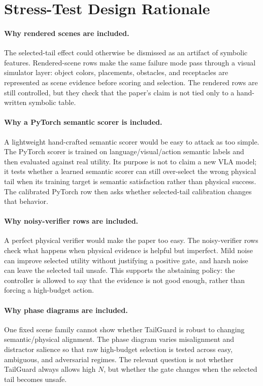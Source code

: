 \documentclass{article}
\begin{document}
\section{Stress-Test Design Rationale}
\label{app:stress-rationale}

\paragraph{Why rendered scenes are included.}
The selected-tail effect could otherwise be dismissed as an artifact of symbolic features. Rendered-scene rows make the same failure mode pass through a visual simulator layer: object colors, placements, obstacles, and receptacles are represented as scene evidence before scoring and selection. The rendered rows are still controlled, but they check that the paper's claim is not tied only to a hand-written symbolic table.

\paragraph{Why a PyTorch semantic scorer is included.}
A lightweight hand-crafted semantic scorer would be easy to attack as too simple. The PyTorch scorer is trained on language/visual/action semantic labels and then evaluated against real utility. Its purpose is not to claim a new VLA model; it tests whether a learned semantic scorer can still over-select the wrong physical tail when its training target is semantic satisfaction rather than physical success. The calibrated PyTorch row then asks whether selected-tail calibration changes that behavior.

\paragraph{Why noisy-verifier rows are included.}
A perfect physical verifier would make the paper too easy. The noisy-verifier rows check what happens when physical evidence is helpful but imperfect. Mild noise can improve selected utility without justifying a positive gate, and harsh noise can leave the selected tail unsafe. This supports the abstaining policy: the controller is allowed to say that the evidence is not good enough, rather than forcing a high-budget action.

\paragraph{Why phase diagrams are included.}
One fixed scene family cannot show whether TailGuard is robust to changing semantic/physical alignment. The phase diagram varies misalignment and distractor salience so that raw high-budget selection is tested across easy, ambiguous, and adversarial regimes. The relevant question is not whether TailGuard always allows high $N$, but whether the gate changes when the selected tail becomes unsafe.
\end{document}
